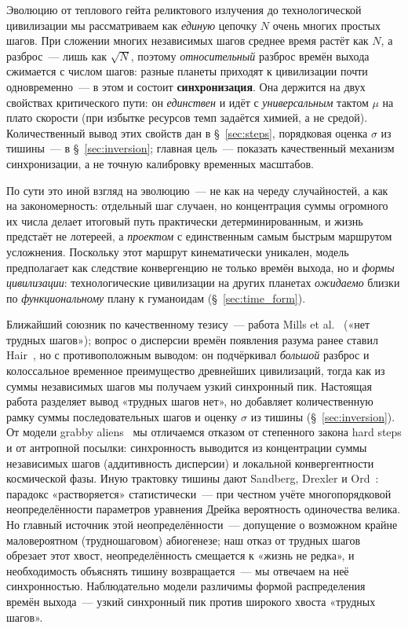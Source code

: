 \documentclass[12pt,a4paper]{article}
\begin{document}
Эволюцию от теплового гейта реликтового излучения до технологической цивилизации мы рассматриваем как \emph{единую} цепочку $N$ очень многих простых шагов. При сложении многих независимых шагов среднее время растёт как $N$, а разброс~--- лишь как $\sqrt{N}$, поэтому \emph{относительный} разброс времён выхода сжимается с числом шагов: разные планеты приходят к цивилизации почти одновременно~--- в этом и состоит \textbf{синхронизация}. Она держится на двух свойствах критического пути: он \emph{единствен} и идёт с \emph{универсальным} тактом $\mu$ на плато скорости (при избытке ресурсов темп задаётся химией, а не средой). Количественный вывод этих свойств дан в \S~\ref{sec:steps}, порядковая оценка $\sigma$ из тишины~--- в \S~\ref{sec:inversion}; главная цель~--- показать качественный механизм синхронизации, а не точную калибровку временных масштабов.

По сути это иной взгляд на эволюцию~--- не как на череду случайностей, а как на закономерность: отдельный шаг случаен, но концентрация суммы огромного их числа делает итоговый путь практически детерминированным, и жизнь предстаёт не лотереей, а \emph{проектом} с единственным самым быстрым маршрутом усложнения. Поскольку этот маршрут кинематически уникален, модель предполагает как следствие конвергенцию не только времён выхода, но и \emph{формы цивилизации}: технологические цивилизации на других планетах \emph{ожидаемо} близки по \emph{функциональному} плану к гуманоидам (\S~\ref{sec:time_form}).

Ближайший союзник по качественному тезису~--- работа Mills et al.~\cite{Mills2025} («нет трудных шагов»); вопрос о дисперсии времён появления разума ранее ставил Hair~\cite{Hair2011}, но с противоположным выводом: он подчёркивал \emph{большой} разброс и колоссальное временное преимущество древнейших цивилизаций, тогда как из суммы независимых шагов мы получаем узкий синхронный пик. Настоящая работа разделяет вывод «трудных шагов нет», но добавляет количественную рамку суммы последовательных шагов и оценку $\sigma$ из тишины (\S~\ref{sec:inversion}). От модели grabby aliens~\cite{Hanson2021} мы отличаемся отказом от степенного закона hard steps и от антропной посылки: синхронность выводится из концентрации суммы независимых шагов (аддитивность дисперсии) и локальной конвергентности космической фазы. Иную трактовку тишины дают Sandberg, Drexler и Ord~\cite{Sandberg2018}: парадокс «растворяется» статистически~--- при честном учёте многопорядковой неопределённости параметров уравнения Дрейка вероятность одиночества велика. Но главный источник этой неопределённости~--- допущение о возможном крайне маловероятном (трудношаговом) абиогенезе; наш отказ от трудных шагов обрезает этот хвост, неопределённость смещается к «жизнь не редка», и необходимость объяснять тишину возвращается~--- мы отвечаем на неё синхронностью. Наблюдательно модели различимы формой распределения времён выхода~--- узкий синхронный пик против широкого хвоста «трудных шагов».
\end{document}
